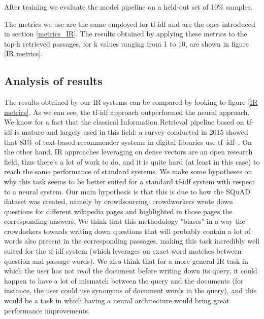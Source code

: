\documentclass{article}
\begin{document}
After training we evaluate the model pipeline on a held-out set of 10\% samples.

The metrics we use are the same employed for tf-idf and are the ones introduced in section \ref{metrics_IR}. The results obtained by applying these metrics to the top-k retrieved passages, for k values ranging from 1 to 10, are shown in figure \ref{IR metrics}.

\subsection{Analysis of results}
The results obtained by our IR systems can be compared by looking to figure \ref{IR metrics}. As we can see, the tf-idf approach outperformed the neural approach. We know for a fact that the classical Information Retrieval pipeline based on tf-idf is mature and largely used in this field: a survey conducted in 2015 showed that 83\% of text-based recommender systems in digital libraries use tf–idf~\cite{wiki_tf-idf}. On the other hand, IR approaches leveraging on dense vectors are an open research field, thus there's a lot of work to do, and it is quite hard (at least in this case) to reach the same performance of standard systems.
We make some hypotheses on why this task seems to be better suited for a standard tf-idf system with respect to a neural system. Our main hypothesis is that this is due to how the SQuAD dataset was created, namely by crowdsourcing: crowdworkers wrote down questions for different wikipedia pages and highlighted in those pages the corresponding answers. We think that this methodology "biases" in a way the crowdorkers towards writing down questions that will probably contain a lot of words also present in the corresponding passages, making this task incredibly well suited for the tf-idf system (which leverages on exact word matches between question and passage words). We also think that for a more general IR task in which the user has not read the document before writing down its query, it could happen to have a lot of mismatch between the query and the documents (for instance, the user could use synonyms of document words in the query), and this would be a task in which having a neural architecture would bring great performance improvements.
\end{document}
